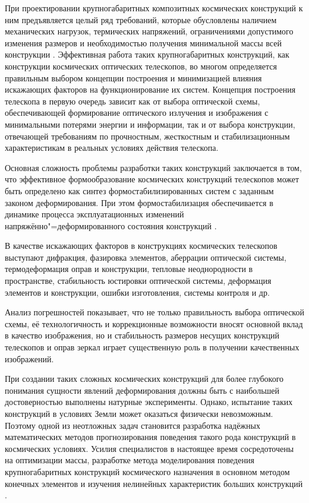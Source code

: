  При проектировании крупногабаритных композитных космических конструкций к ним предъявляется целый ряд требований, которые обусловлены наличием механических нагрузок, термических напряжений, ограничениями допустимого изменения размеров и необходимостью получения минимальной массы всей конструкции \cite{bit:bib1}. Эффективная работа таких крупногабаритных конструкций, как конструкции космических оптических телескопов, во многом определяется правильным выбором концепции построения и минимизацией влияния искажающих факторов на функционирование их систем. Концепция построения телескопа в первую очередь зависит как от выбора оптической схемы, обеспечивающей формирование оптического излучения и изображения с минимальными потерями энергии и информации, так и от выбора конструкции, отвечающей требованиям по прочностным, жесткостным и стабилизационным характеристикам в реальных условиях действия телескопа.



Основная сложность проблемы разработки таких конструкций заключается в том, что эффективное формообразование космических конструкций телескопов может быть определено как синтез формостабилизированных систем с заданным законом деформирования. При этом формостабилизация обеспечивается в динамике процесса эксплуатационных изменений напряжённо"=деформированного состояния конструкций \cite{bit:bib2}.



В качестве искажающих факторов в конструкциях космических телескопов выступают дифракция, фазировка элементов, аберрации оптической системы, термодеформация оправ и конструкции, тепловые неоднородности в пространстве, стабильность юстировки оптической системы, деформация элементов и конструкции, ошибки изготовления, системы контроля и др.



Анализ погрешностей показывает, что не только правильность выбора оптической схемы, её технологичность и коррекционные возможности вносят основной вклад в качество изображения, но и стабильность размеров несущих конструкций телескопов и оправ зеркал играет существенную роль в получении качественных изображений.



При создании таких сложных космических конструкций для более глубокого понимания сущности явлений деформирования должны быть с наибольшей достоверностью выполнены натурные эксперименты. Однако, испытание таких конструкций в условиях Земли может оказаться физически невозможным. Поэтому одной из неотложных задач становится разработка надёжных математических методов прогнозирования поведения такого рода конструкций в космических условиях. Усилия специалистов в настоящее время сосредоточены на оптимизации массы, разработке метода моделирования поведения крупногабаритных конструкций космического назначения в основном методом конечных элементов и изучения нелинейных характеристик больших конструкций \cite{bit:bib3}.



